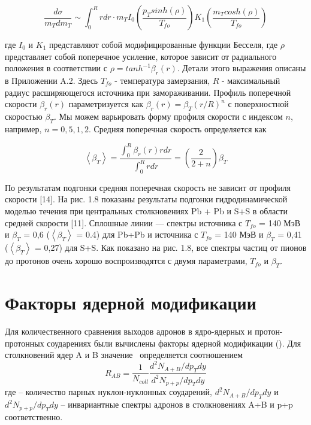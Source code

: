 \begin{linenomath}
	\begin{equation}
		\frac{d \sigma}{m_T dm_T} \sim \int_0^R r dr \cdot m_T 
		I_0 \left(\frac{p_T sinh(\rho)}{T_{fo}}\right) K_1 \left(\frac{m_T cosh(\rho)}{T_{fo}} \right)
	\end{equation}
\end{linenomath}
где $I_0$ и $K_1$ представляют собой модифицированные функции Бесселя, где $\rho$ представляет собой поперечное усиление, которое зависит от радиального положения в соответствии с $\rho = tanh^{-1} \beta_r(r)$. Детали этого выражения описаны в Приложении A.2. Здесь $T_{fo}$ - температура замерзания, $R$ - максимальный радиус расширяющегося источника при замораживании. Профиль поперечной скорости $\beta_r(r)$ параметризуется как $\beta_r(r) = \beta_T(r/R)^n$ с поверхностной скоростью $\beta_T$. Мы можем варьировать форму профиля скорости с индексом $n$, например, $n = 0,5,1,2$. Средняя поперечная скорость определяется как
\begin{linenomath}
	\begin{equation}
		\left< \beta_T \right> = \frac{\int_0^R \beta_r(r)r dr}{\int_0^R r dr} = \left(\frac{2}{2+n} \right)\beta_T
	\end{equation}
\end{linenomath}
По результатам подгонки средняя поперечная скорость не зависит от профиля скорости [14]. На рис. 1.8 показаны результаты подгонки гидродинамической моделью течения при центральных столкновениях Pb + Pb и S+S в области средней скорости [11]. Сплошные линии — спектры источника с $T_{fo}$ = 140 МэВ и $\beta_T$ = 0,6 ($\left< \beta_T \right>$ = 0.4) для Pb+Pb и источника с $T_{fo}$ = 140 МэВ и $\beta_T$ = 0,41 ($\left< \beta_T \right>$ = 0,27) для S+S. Как показано на рис. 1.8, все спектры частиц от пионов до протонов очень хорошо воспроизводятся с двумя параметрами, $T_{fo}$ и $\beta_T$.

\section{Факторы ядерной модификации}
Для количественного сравнения выходов адронов в ядро-ядерных и протон-протонных соударениях были вычислены факторы ядерной модификации (\rab). Для столкновений ядер A и B значение \rab \ определяется соотношением
\begin{equation}
	\label{eq:rab}
	R_{AB}=\frac{1}{N_{coll}}\frac{d^2 N_{A+B}/dp_T dy}{d^2 N_{p+p}/dp_T dy} 
\end{equation}
где \Ncoll – количество парных нуклон-нуклонных соударений, 
$d^2 N_{A+B}/dp_T dy$ и $d^2 N_{p+p}/dp_T dy$ – инвариантные спектры адронов в столкновениях A+B и p+p соответственно.



